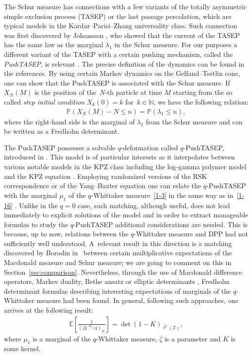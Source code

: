 \documentclass[pdftex]{sigma}
\numberwithin{equation}{section}
\newcommand{\E}[1]{\widetilde{e}_{#1}}
\def\E{\mathbb{E}}
\def\i{\infty}
\def\l{\lambda}
\def\P{\mathbb{P}}
\def\Z{\mathbb{Z}}
\begin{document}
The Schur measure has connections with a few variants of the totally asymmetric simple exclusion process (TASEP) or the last passage percolation, which are typical models in the Kardar--Parisi--Zhang universality class. Such connection was first discovered by Johansson \cite{Johansson2000}, who showed that the current of the TASEP has the same law as the marginal $\l_1$ in the Schur measure.
 For our purposes a different variant of the TASEP with a certain pushing mechanism, called the \emph{PushTASEP}, is relevant
 \cite{Borodin2008,Warren-Windridge2009}.
 The precise definition of the dynamics can be found in the references.
 By using certain Markov dynamics on the Gelfand--Tsetlin cone,
 one can show that
 the PushTASEP is associated with the Schur measure. If $X_N(M)$ is the position of the~$N$-th particle at time $M$ starting from the so called \emph{step initial condition} $X_k(0)=k$ for~${k\in \mathbb{N}}$, we have the following relation:
 \begin{align}
 \label{1-16}
 \P (X_N(M)-N\le n)=\P(\l_1\le n),
 \end{align}
 where the right-hand side is the marginal of $\l_1$ from the Schur measure and can be written as
 a Fredholm determinant.

 The PushTASEP possesses a solvable $q$-deformation called $q$-PushTASEP, introduced in \mbox{\cite{BorodinPetrov2013NN, MatveevPetrov2015}}. This model is of particular interests as it interpolates between various notable models in the KPZ class including the log-gamma polymer model and the KPZ equation \cite{BoCoFeVe2015,MatveevPetrov2015}.
 Employing randomized versions of the RSK correspondence or of the Yang--Baxter equation one can relate the $q$-PushTASEP with the marginal $\mu_1$ of the $q$-Whittaker measure~\eqref{1-3} in the same way as in~\eqref{1-16} \cite{BufetovMucciconiPetrov2019,MatveevPetrov2015,MucciconiPetrov2020qWprocess}. Unlike in the $q=0$ case, such matching, although useful, does not lead immediately to explicit solutions of the model and in order to extract manageable formulas to study the $q$-PushTASEP additional considerations are needed. This is because, up to now, relations between the $q$-Whittaker measure and DPP had not sufficiently well understood. A~relevant result in this direction is a matching discovered by Borodin in~\cite{Borodin2018momentmatch} between certain multiplicative expectations of the Macdonald measure and Schur measure; we are going to comment on this in Section~\ref{sec:comparison}. Nevertheless, through the use of Macdonald difference operators, Markov duality, Bethe ansatz or elliptic determinants \cite{BorodinCorwin2014Mac,bcs2014,ImamuraSasamoto2019qTASEPtheta}, Fredholm determinant formulas describing interesting expectations of marginals of the $q$-Whittaker measure had been found. In general, following such approaches, one arrives at the following result:
 \begin{align}
 \label{qEdet}
 \E\left[\frac{1}{(\zeta q^{-\mu_1};q)_{\i}}\right]
 =
 \det(1- K)_{\ell^2(\Z)},
 \end{align}
 where $\mu_1$ is a marginal of the $q$-Whittaker measure, $\zeta$ is a parameter and $K$ is some kernel.
\end{document}
